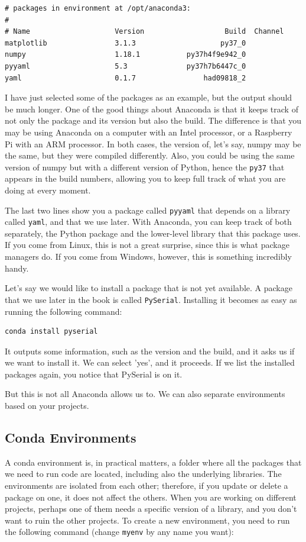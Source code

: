 \begin{verbatim}
# packages in environment at /opt/anaconda3:
#
# Name                    Version                   Build  Channel
matplotlib                3.1.3                    py37_0
numpy                     1.18.1           py37h4f9e942_0
pyyaml                    5.3              py37h7b6447c_0
yaml                      0.1.7                had09818_2
\end{verbatim}

I have just selected some of the packages as an example, but the output should be much longer. One of the good things about Anaconda is that it keeps track of not only the package and its version but also the build. The difference is that you may be using Anaconda on a computer with an Intel processor, or a Raspberry Pi with an ARM processor. In both cases, the version of, let's say, numpy may be the same, but they were compiled differently. Also, you could be using the same version of numpy but with a different version of Python, hence the \texttt{py37} that appears in the build numbers, allowing you to keep full track of what you are doing at every moment.

The last two lines show you a package called \texttt{pyyaml} that depends on a library called \texttt{yaml}, and that we use later. With Anaconda, you can keep track of both separately, the Python package and the lower-level library that this package uses. If you come from Linux, this is not a great surprise, since this is what package managers do. If you come from Windows, however, this is something incredibly handy.

Let's say we would like to install a package that is not yet available. A package that we use later in the book is called \texttt{PySerial}. Installing it becomes as easy as running the following command:

\begin{verbatim}
conda install pyserial
\end{verbatim}

It outputs some information, such as the version and the build, and it asks us if we want to install it. We can select 'yes', and it proceeds. If we list the installed packages again, you notice that PySerial is on it.

But this is not all Anaconda allows us to. We can also separate environments based on your projects.

\subsection{Conda Environments}\label{subsec:conda-environments}
A conda environment is, in practical matters, a folder where all the packages that we need to run code are located, including also the underlying libraries. The environments are isolated from each other; therefore, if you update or delete a package on one, it does not affect the others. When you are working on different projects, perhaps one of them needs a specific version of a library, and you don't want to ruin the other projects. To create a new environment, you need to run the following command (change \texttt{myenv} by any name you want):

